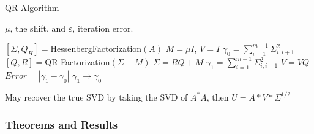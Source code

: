 \begin{algorithm}[H]
\caption{QR-Algorithm }
\centering
\begin{algorithmic}[1]

\Require $\mu$, the shift, and $\varepsilon$, iteration error.

\State $[\Sigma,Q_H]=$HessenbergFactorization$(A)$
\State $M=\mu I$, $V=I$
\State $\displaystyle \gamma_0=\sum_{i=1}^{m-1} \Sigma_{i,i+1}^2$
\State $[Q,R]=$QR-Factorization$(\Sigma-M)$
\State $\Sigma=RQ+M$
\State $\displaystyle \gamma_1=\sum_{i=1}^{m-1} \Sigma_{i,i+1}^2$
\State $V=VQ$
\State $Error=|\gamma_1-\gamma_0|$
\State $\gamma_1\rightarrow \gamma_0$
\EndWhile

\EndProcedure
\end{algorithmic}
\end{algorithm}

May recover the true SVD by taking the SVD of $A^* A$, then $U=A*V*\Sigma^{1/2}$


\subsubsection{Theorems and Results}

